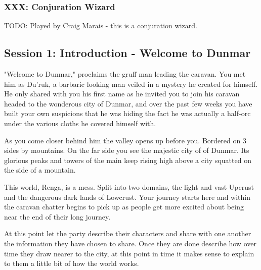 \documentclass[10pt,twoside,twocolumn]{article}
\begin{document}
\subsubsection{XXX: Conjuration Wizard}
TODO: Played by Craig Marais - this is a conjuration wizard.

\subsection{Session 1: Introduction - Welcome to Dunmar}
\begin{quotebox}
"Welcome to Dunmar," proclaims the gruff man leading the caravan. You met him as Du'ruk, a barbaric looking man veiled in a mystery he created for himself. He only shared with you his first name as he invited you to join his caravan headed to the wonderous city of Dunmar, and over the past few weeks you have built your own suspicions that he was hiding the fact he was actually a half-orc under the various cloths he covered himself with.

As you come closer behind him the valley opens up before you. Bordered on 3 sides by mountains. On the far side you see the majestic city of of Dunmar. Its glorious peaks and towers of the main keep rising high above a city squatted on the side of a mountain.

This world, Renga, is a mess. Split into two domains, the light and vast Upcrust and the dangerous dark lands of Lowcrust. Your journey starts here and within the caravan chatter begins to pick up as people get more excited about being near the end of their long journey.
\end{quotebox}

At this point let the party describe their characters and share with one another the information they have chosen to share. Once they are done describe how over time they draw nearer to the city, at this point in time it makes sense to explain to them a little bit of how the world works.
\end{document}
